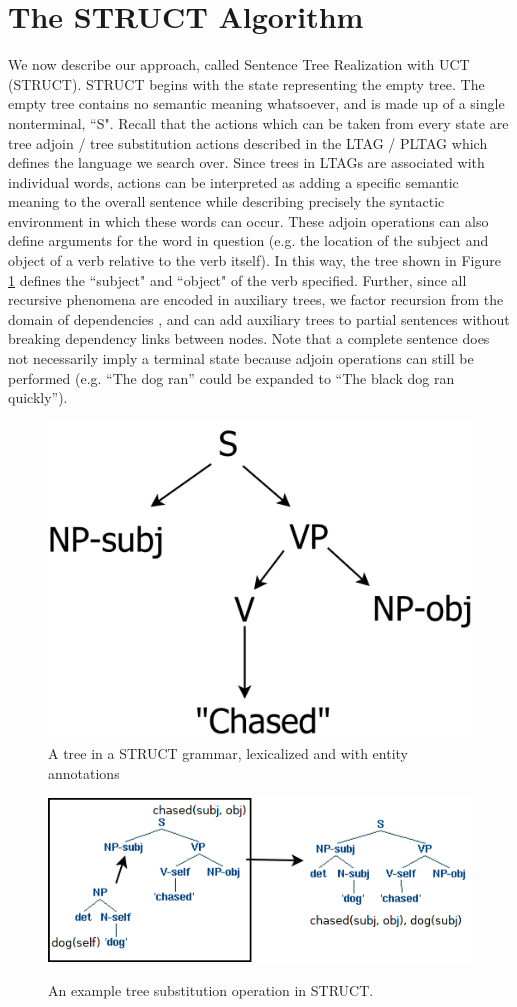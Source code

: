 \section{The STRUCT Algorithm}
We now describe our approach, called Sentence Tree Realization with
UCT (STRUCT).
STRUCT begins with the state representing the empty tree.  The empty tree
contains no semantic meaning whatsoever, and is made up of a single
nonterminal, ``S".  Recall that the actions which can be taken from
every state are tree adjoin / tree substitution actions described in the
LTAG / PLTAG which defines the language we search over.
Since trees in LTAGs are associated
with individual words, actions can be interpreted as adding a specific
semantic meaning to the overall sentence while describing precisely
the syntactic environment in which these words can occur.
These adjoin operations can also
define arguments for the word in question (e.g. the
location of the subject and object of a verb relative to the verb itself).
In this way, the tree shown in Figure \ref{s-to-npvp} defines the
``subject" and ``object" of the verb specified.
Further, since all recursive phenomena are
encoded in auxiliary trees, we factor recursion from the domain of
dependencies \cite{bauer2009statistical}, and can add auxiliary trees
to partial sentences without breaking dependency links between nodes.
Note that a complete sentence does not necessarily imply
a terminal state because adjoin operations can still be performed
(e.g. ``The dog ran'' could be expanded to ``The black dog ran quickly'').

\begin{figure}
\centering
\includegraphics[width=.4\linewidth]{s-vpnp.png}
\caption{A tree in a STRUCT grammar, lexicalized and with entity annotations}
\label{s-to-npvp}
\end{figure}

\begin{figure}[t]
\centering
\includegraphics[width= 0.7 \linewidth]{sub-example.png}\label{examples-s}
\caption{An example tree substitution operation in STRUCT.}
\end{figure}

